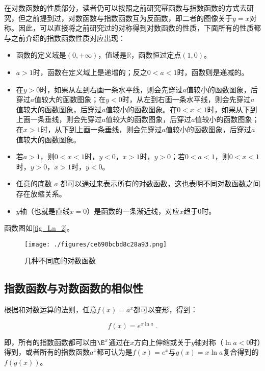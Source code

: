 在对数函数的性质部分，读者仍可以按照之前研究幂函数与指数函数的方式去研究，但之前提到过，对数函数与指数函数互为反函数，即二者的图像关于$y=x$对称。因此，可以直接将之前研究过的对称得到对数函数的性质，下面所有的性质都与之前介绍的指数函数性质对应出现：
\begin{itemize}
\item 函数的定义域是$(0,+\infty)$，值域是$\mathbb{R}$，函数恒过定点$(1,0)$。
\item $a>1$时，函数在定义域上是递增的；反之$0<a<1$时，函数则是递减的。
\item 在$y>0$时，如果从左到右画一条水平线，则会先穿过$a$值较小的函数图象，后穿过$a$值较大的函数图象；在$y<0$时，从左到右画一条水平线，则会先穿过$a$值较大的函数图象，后穿过$a$值较小的函数图象。在$0<x<1$时，如果从下到上画一条垂线，则会先穿过$a$值较大的函数图象，后穿过$a$值较小的函数图象；在$x>1$时，从下到上画一条垂线，则会先穿过$a$值较小的函数图象，后穿过$a$值较大的函数图象。
\item 若$a>1$，则$0<x<1$时，$y<0$，$x>1$时，$y>0$；若$0<a<1$，则$0<x<1$时，$y>0$，$x>1$时，$y<0$。
\item 任意的底数 $a$ 都可以通过来表示所有的对数函数，这也表明不同对数函数之间存在放缩关系。
\item $y$轴（也就是直线$x=0$）是函数的一条渐近线，对应$x$趋于$0$时。
\end{itemize}

函数图如\autoref{fig_Ln_2}。
\begin{figure}[ht]
\centering
\texttt{[image: ./figures/ce690bcbd8c28a93.png]}
\caption{几种不同底的对数函数} \label{fig_Ln_2}
\end{figure}

\subsection{指数函数与对数函数的相似性}\label{sub_Ln_1}


根据和对数运算的法则，任意$f(x)=a^x$都可以变形，得到：

\begin{equation}
f(x)=e^{x\ln a}~.
\end{equation}

即，所有的指数函数都可以由$\E^x$通过在$x$方向上伸缩或关于$y$轴对称（$\ln a<0$时）得到，或者所有的指数函数$a^x$都可认为是$f(x)=e^x$与$g(x)=x\ln a$复合得到的$f(g(x))$。

